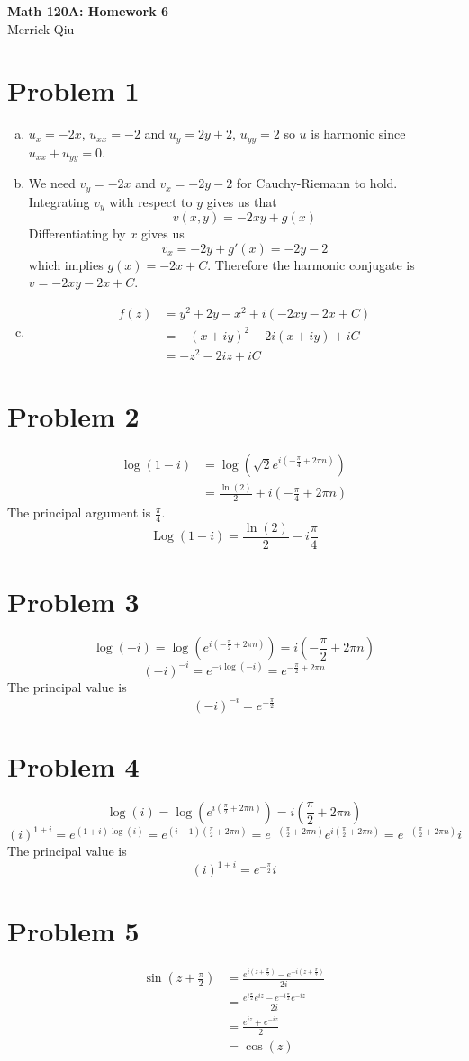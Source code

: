 \documentclass{article}
\begin{document}
\begin{center}
	\huge{\bf Math 120A: Homework 6} \\
	Merrick Qiu
\end{center}
\section*{Problem 1}
\begin{enumerate}[(a)]
	\item $u_x = -2x$, $u_{xx} = -2$ and $u_y = 2y+2$, $u_{yy} = 2$ so $u$ is harmonic since
	$u_{xx} + u_{yy} = 0$.
	\item We need $v_y = -2x$ and $v_x = -2y-2$ for Cauchy-Riemann to hold.
	Integrating $v_y$ with respect to $y$ gives us that 
	\[
		v(x,y) = -2xy + g(x)
	\]
	Differentiating by $x$ gives us 
	\[
		v_x = -2y + g'(x) = -2y-2
	\]
	which implies $g(x) = -2x+C$.
	Therefore the harmonic conjugate is $v = -2xy-2x + C$.
	\item 
	\begin{align*}
		f(z) &= y^2+2y-x^2 + i(-2xy-2x+C) \\
		&= -(x+iy)^2 - 2i(x+iy) + iC\\
		&= -z^2 - 2iz + iC
	\end{align*}
\end{enumerate}
\newpage 
\section*{Problem 2}
	\begin{align*}
		\log(1-i) &= \log(\sqrt{2}e^{i\left(-\frac{\pi}{4}+2\pi n\right)}) \\
		&= \frac{\ln(2)}{2} + i\left(-\frac{\pi}{4}+2\pi n\right)
	\end{align*}
	The principal argument is $\frac{\pi}{4}$.
	\[
		\operatorname{Log}(1-i) = \frac{\ln(2)}{2} - i\frac{\pi}{4}
	\]
\newpage 
\section*{Problem 3}
	\[
		\log(-i) = \log(e^{i\left(-\frac{\pi}{2} + 2\pi n\right)}) = i\left(-\frac{\pi}{2} + 2\pi n\right)
	\]
	\[
		(-i)^{-i} = e^{-i\log(-i)} = e^{-\frac{\pi}{2} + 2\pi n}
	\]
	The principal value is 
	\[
		(-i)^{-i} = e^{-\frac{\pi}{2}}
	\]
\newpage 
\section*{Problem 4}
	\[
		\log(i) = \log(e^{i\left(\frac{\pi}{2} + 2\pi n\right)}) = i\left(\frac{\pi}{2} + 2\pi n\right)
	\]
	\[
		(i)^{1+i} = e^{(1+i)\log(i)} = e^{(i-1)\left(\frac{\pi}{2} + 2\pi n\right)} = e^{-\left(\frac{\pi}{2} + 2\pi n\right)}e^{i\left(\frac{\pi}{2} + 2\pi n\right)} = e^{-\left(\frac{\pi}{2} + 2\pi n\right)}i
	\]
	The principal value is 
	\[
		(i)^{1+i} = e^{-\frac{\pi}{2}}i
	\]
\newpage 
\section*{Problem 5}
	\begin{align*}
		\sin\left(z+\frac{\pi}{2}\right) &= \frac{e^{i\left(z+\frac{\pi}{2}\right)}-e^{-i\left(z+\frac{\pi}{2}\right)}}{2i} \\
		&= \frac{e^{i\frac{\pi}{2}}e^{iz}-e^{-i\frac{\pi}{2}}e^{-iz}}{2i} \\
		&= \frac{e^{iz}+e^{-iz}}{2} \\
		&= \cos(z)
	\end{align*}
\newpage 
\end{document}
